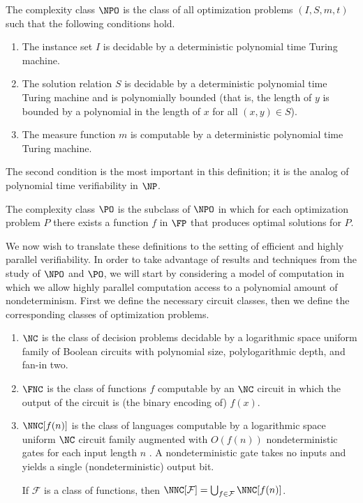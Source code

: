 \begin{definition}\label{def:npo}
  The complexity class $\NPO$ is the class of all optimization problems $(I, S, m, t)$ such that the following conditions hold.
  \begin{enumerate}
  \item The instance set $I$ is decidable by a deterministic polynomial time Turing machine.
  \item The solution relation $S$ is decidable by a deterministic polynomial time Turing machine and is polynomially bounded (that is, the length of $y$ is bounded by a polynomial in the length of $x$ for all $(x, y)\in S$).
  \item The measure function $m$ is computable by a deterministic polynomial time Turing machine.
  \end{enumerate}
\end{definition}

The second condition is the most important in this definition; it is the analog of polynomial time verifiability in $\NP$.

\begin{definition}
  The complexity class $\PO$ is the subclass of $\NPO$ in which for each optimization problem $P$ there exists a function $f$ in $\FP$ that produces optimal solutions for $P$.
\end{definition}

We now wish to translate these definitions to the setting of efficient and highly parallel verifiability.
In order to take advantage of results and techniques from the study of $\NPO$ and $\PO$, we will start by considering a model of computation in which we allow highly parallel computation access to a polynomial amount of nondeterminism.
First we define the necessary circuit classes, then we define the corresponding classes of optimization problems.

\begin{definition}
  \mbox{}
  \begin{enumerate}
  \item $\NC$ is the class of decision problems decidable by a logarithmic space uniform family of Boolean circuits with polynomial size, polylogarithmic depth, and fan-in two.
  \item $\FNC$ is the class of functions $f$ computable by an $\NC$ circuit in which the output of the circuit is (the binary encoding of) $f(x)$.
  \item $\NNC[f(n)]$ is the class of languages computable by a logarithmic space uniform $\NC$ circuit family augmented with $O(f(n))$ nondeterministic gates for each input length $n$ \cite{wolf94}.
    A nondeterministic gate takes no inputs and yields a single (nondeterministic) output bit.

    If $\mathcal{F}$ is a class of functions, then $\NNC[\mathcal{F}] = \bigcup_{f \in \mathcal{F}} \NNC[f(n)]$.
  \end{enumerate}
\end{definition}

